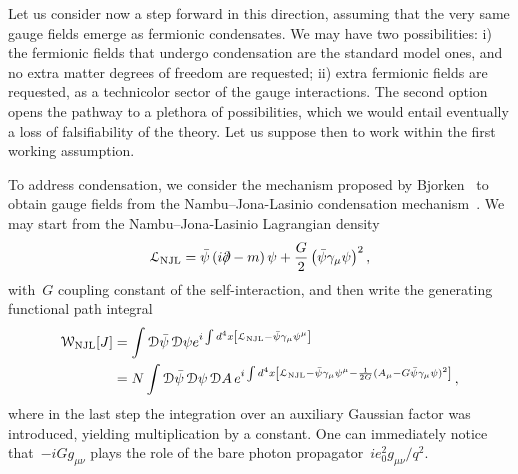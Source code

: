 \documentclass[reqno,11pt]{amsart}
\numberwithin{equation}{section}
\newcommand{\1}{\mbox{\rm 1 \hspace{-1.05 em} 1}}
\newcommand{\Pdd}{\mbox{$\partial$ \hspace{-1.2 em} $/$}}
\newcommand\Felix[1]{}
\begin{document}
\begin{enumerate}[leftmargin=2em]
Let us consider now a step forward in this direction, assuming that the very same gauge fields emerge as fermionic condensates. We may have two possibilities: i) the fermionic fields that undergo condensation are the standard model ones, and no extra matter degrees of freedom are requested; ii) extra fermionic fields are requested, as a technicolor sector of the gauge interactions. The second option opens the pathway to a plethora of possibilities, which we would entail eventually a loss of falsifiability of the theory. Let us suppose then to work within the first working assumption.

To address condensation, we consider the mechanism proposed by Bjorken~\cite{Bjo1, Bjo2, Bjo3} to obtain gauge fields from the Nambu--Jona-Lasinio condensation mechanism~\cite{NJL1, NJL2}. We may start from the Nambu--Jona-Lasinio Lagrangian density
\[ %
\mathcal{L}_{\rm NJL}=\bar{\psi} \left( i \Pdd -m \right) \psi + \frac{G}{2} \left( \bar{\psi} \gamma_\mu \psi  \right)^2, \]
with~$G$ coupling constant of the self-interaction, and then write the generating functional path integral
\Felix{What is $\psi^\mu$? Should it be~$\partial_\mu \psi$?}%
\begin{align*} %
\mathcal{W}_{\rm NJL}[J] &=\int \mathcal{D}\bar{\psi}\,  \mathcal{D}\psi e^{ i \int d^4 x \left[  \mathcal{L}_{\rm NJL} - \bar{\psi} \gamma_\mu \psi ^\mu  \right]} \\ 
&= N \int \mathcal{D}\bar{\psi}\,  \mathcal{D}\psi \, \mathcal{D}A \, e^{ i \int d^4 x \left[  \mathcal{L}_{\rm NJL} - \bar{\psi} \gamma_\mu \psi ^\mu  -\frac{1}{2G} (A_\mu -G \bar{\psi}\gamma_\mu \psi )^2\right]} \,,
\end{align*}
where in the last step the integration over an auxiliary Gaussian factor was introduced, yielding multiplication by a constant. One can immediately notice that~$-iG g_{\mu \nu}$ plays the role of the bare photon propagator~$i e_0^2 g_{\mu \nu}/q^2$.


\end{enumerate}
\end{document}
